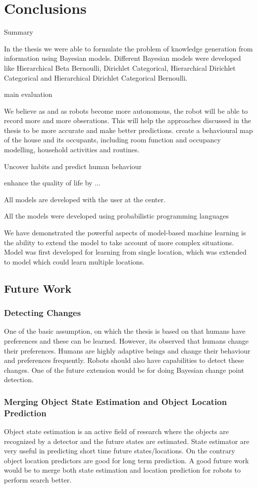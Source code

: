 \chapter{Conclusions}
\label{cha:}


Summary 

In the thesis we were able to formulate the problem of knowledge generation from information using Bayesian models. Different Bayesian models were developed like Hierarchical Beta Bernoulli, Dirichlet Categorical, Hierarchical Dirichlet Categorical and Hierarchical Dirichlet Categorical Bernoulli.

main evaluation


We believe as and as robots become more autonomous, the robot will be able to record more and more obserations. This will help the approaches discussed in the thesis to be more accurate and make better predictions.
 create a behavioural map of the house and its occupants, including room function and occupancy modelling, household activities and routines.

Uncover habits and predict human behaviour 


enhance the quality of life by  ... 

All models are developed with the user at the center. 

All the models were developed using probabilistic programming languages 


We have demonstrated the  powerful aspects of model-based machine learning is the ability to extend the model to take account of more complex situations. 
Model was first developed for learning from single location,  which was extended to model which could learn multiple locations. 
\section{Future Work}

\subsection{Detecting Changes}
One of the basic assumption, on which the thesis is based on that humans have preferences and these can be learned. However, its observed that humans change their preferences. Humans are highly adaptive beings and change their behaviour and preferences frequently. Robots should also have capabilities to detect these changes. One of the future extension would be for doing Bayesian change point detection.

\subsection{Merging Object State Estimation and Object Location Prediction}
Object state estimation is an active field of research\cite{schulz2001probabilistic} where the objects are recognized by a detector and the future states are estimated. State estimator are very useful in predicting short time future states/locations. On the contrary object location predictors are good for long term prediction. A good future work would be to merge both state estimation and location prediction for robots to perform search better.

